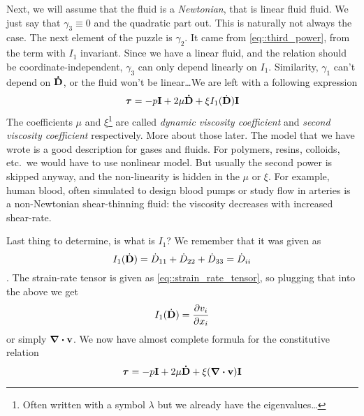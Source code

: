 \documentclass[a4paper]{article}
\begin{document}
Next, we will assume that the fluid is a \emph{Newtonian}, that is linear fluid
fluid. We just say that \(\gamma_3 \equiv 0\) and  the quadratic part out. This is naturally not always the
case. The next element of the puzzle is \(\gamma_2\). It came from 
\autoref{eq::third_power}, from the term with \(I_1\) invariant. Since we have a 
linear fluid, and the relation should be coordinate-independent, \(\gamma_3\) can
only depend linearly on \(I_1\). Similarity, \(\gamma_1\) can't depend on 
\(\vb{\dot{D}}\), or the fluid won't be linear\dots We are left with a following
expression
\begin{equation}
  \bm{\tau} = -p\vb{I} +  2\mu\vb{\dot{D}} + \xi I_1(\dot{\vb{D}}) \vb{I}
\end{equation}
The coefficients \(\mu\) and \(\xi\)\footnote{Often written with a symbol 
\(\lambda\) but we already have the eigenvalues\dots} are called 
\emph{dynamic viscosity coefficient} and \emph{second viscosity coefficient} 
respectively. More about those later. The model that we have wrote is a good 
description for gases and  fluids. For polymers, resins, colloids,
etc.\ we would have to use nonlinear model. But usually the second power is 
skipped anyway, and the non-linearity is hidden in the \(\mu\) or \(\xi\). 
For example, human blood, often simulated to design blood pumps or study flow 
in arteries is a non-Newtonian shear-thinning fluid: the viscosity decreases 
with increased shear-rate.

Last thing to determine, is what is \(I_1\)? We remember that it was given as 
\[
I_1(\dot{\vb{D}}) = \dot{D}_{11} + \dot{D}_{22} + \dot{D}_{33} =
\dot{D}_{ii}\].
The strain-rate tensor is given as \autoref{eq::strain_rate_tensor}, so 
plugging that into the above we get 
\[
  I_1(\dot{\vb{D}}) = \pdv{v_i}{x_i} 
\]
or simply \(\div\vb{v}\). We now have almost complete formula for the 
constitutive relation
\begin{equation*}
  \bm{\tau} = -p\vb{I} +  2\mu\vb{\dot{D}} + \xi (\div\vb{v}) \vb{I}
\end{equation*}
\end{document}
